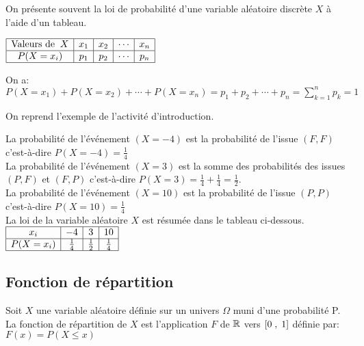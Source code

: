 \begin{remark}
 On présente souvent la loi de probabilité d'une variable aléatoire  discrète $ X $ à l'aide d'un tableau.

$\begin{array}{|c|c|c|c|c|}
\hline
\text{Valeurs de}\;\;  X & x_{1}& x_{2} &\cdots  &x_{n}\\
\hline
 P(X=x_{i})  &  p_{1} &  p_{2}   &\cdots   &  p_{n} \\
\hline
\end{array}$

On a: $ P(X=x_{1})+P(X=x_{2})+\cdots +P(X=x_{n})= p_{1}+p_{2}+\cdots + p_{n}=\displaystyle\sum_{k=1}^n p_{k}= 1 $
\end{remark}
\begin{example}
On reprend l'exemple de l'activité d'introduction.

 La probabilité de l'événement  $ (X= -4) $  est la probabilité de l'issue $ (F,F) $ c'est-à-dire $ P(X=-4) =\frac{1}{4}$\\
La probabilité de l'événement  $ (X= 3) $  est la somme des  probabilités des issues $ (P,F) $  et  $ (F,P) $ c'est-à-dire $ P(X=3) =\frac{1}{4}+\frac{1}{4}=\frac{1}{2}$.\\
La probabilité de l'événement  $ (X= 10) $  est la probabilité de l'issue $ (P,P) $ c'est-à-dire $ P(X=10) =\frac{1}{4}$\\ La loi de la variable aléatoire $ X $ est résumée dans le tableau ci-dessous.\\

$\begin{array}{|c|c|c|c|c|}
\hline
  x_{i} &  -4 &  3 & 10 \\
\hline
 P(X=x_{i})  &  \frac{1}{4} &  \frac{1}{2}    &  \frac{1}{4} \\
\hline
\end{array}$
\end{example}
\subsection{Fonction de répartition}
\begin{definition}
Soit $ X $  une variable aléatoire définie sur un univers $ \Omega $ muni d'une probabilité P.\\
La fonction de répartition de $ X $  est l'application $ F $ de $ \mathbb{R} $ vers $ \left[0\;,\; 1\right] $ définie par:\;$ F(x)=P (X\leq x) $
\end{definition}

